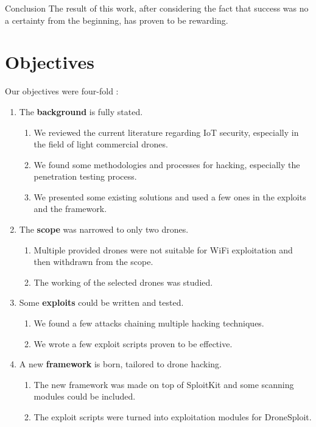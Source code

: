 \begin{chaptercover}{Conclusion}
The result of this work, after considering the fact that success was no a certainty from the beginning, has proven to be rewarding.  

\section{Objectives}
Our objectives were four-fold :
{\hyphenation{}
\begin{enumerate}[itemsep=0.1cm,topsep=0.1cm]
  \item The \textbf{background} is fully stated.
  \begin{enumerate}[label=\Alph* --,align=left,itemsep=.05cm,topsep=0.1cm]
    \item We reviewed the current literature regarding IoT security, especially in the field of light commercial drones.
    \item We found some methodologies and processes for hacking, especially the penetration testing process.
    \item We presented some existing solutions and used a few ones in the exploits and the framework.
  \end{enumerate}
  \item The \textbf{scope} was narrowed to only two drones.
  \begin{enumerate}[label=\Alph* --,align=left,itemsep=.05cm,topsep=0.1cm]
    \item Multiple provided drones were not suitable for WiFi exploitation and then withdrawn from the scope.
    \item The working of the selected drones was studied.
  \end{enumerate}
  \item Some \textbf{exploits} could be written and tested.
  \begin{enumerate}[label=\Alph* --,align=left,itemsep=.05cm,topsep=0.1cm]
    \item We found a few attacks chaining multiple hacking techniques.
    \item We wrote a few exploit scripts proven to be effective.
  \end{enumerate}
  \item A new \textbf{framework} is born, tailored to drone hacking.
  \begin{enumerate}[label=\Alph* --,align=left,itemsep=.05cm,topsep=0.1cm]
    \item The new framework was made on top of SploitKit and some scanning modules could be included.
    \item The exploit scripts were turned into exploitation modules for DroneSploit.
  \end{enumerate}
\end{enumerate}}


\end{chaptercover}
